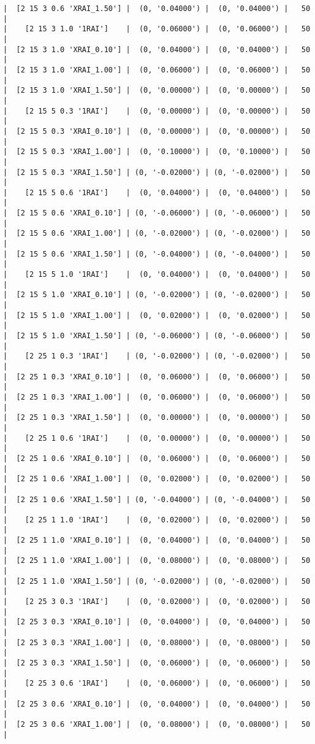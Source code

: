 \documentclass{article}
\begin{document}
\begin{verbatim}
|  [2 15 3 0.6 'XRAI_1.50'] |  (0, '0.04000') |  (0, '0.04000') |   50  |
|    [2 15 3 1.0 '1RAI']    |  (0, '0.06000') |  (0, '0.06000') |   50  |
|  [2 15 3 1.0 'XRAI_0.10'] |  (0, '0.04000') |  (0, '0.04000') |   50  |
|  [2 15 3 1.0 'XRAI_1.00'] |  (0, '0.06000') |  (0, '0.06000') |   50  |
|  [2 15 3 1.0 'XRAI_1.50'] |  (0, '0.00000') |  (0, '0.00000') |   50  |
|    [2 15 5 0.3 '1RAI']    |  (0, '0.00000') |  (0, '0.00000') |   50  |
|  [2 15 5 0.3 'XRAI_0.10'] |  (0, '0.00000') |  (0, '0.00000') |   50  |
|  [2 15 5 0.3 'XRAI_1.00'] |  (0, '0.10000') |  (0, '0.10000') |   50  |
|  [2 15 5 0.3 'XRAI_1.50'] | (0, '-0.02000') | (0, '-0.02000') |   50  |
|    [2 15 5 0.6 '1RAI']    |  (0, '0.04000') |  (0, '0.04000') |   50  |
|  [2 15 5 0.6 'XRAI_0.10'] | (0, '-0.06000') | (0, '-0.06000') |   50  |
|  [2 15 5 0.6 'XRAI_1.00'] | (0, '-0.02000') | (0, '-0.02000') |   50  |
|  [2 15 5 0.6 'XRAI_1.50'] | (0, '-0.04000') | (0, '-0.04000') |   50  |
|    [2 15 5 1.0 '1RAI']    |  (0, '0.04000') |  (0, '0.04000') |   50  |
|  [2 15 5 1.0 'XRAI_0.10'] | (0, '-0.02000') | (0, '-0.02000') |   50  |
|  [2 15 5 1.0 'XRAI_1.00'] |  (0, '0.02000') |  (0, '0.02000') |   50  |
|  [2 15 5 1.0 'XRAI_1.50'] | (0, '-0.06000') | (0, '-0.06000') |   50  |
|    [2 25 1 0.3 '1RAI']    | (0, '-0.02000') | (0, '-0.02000') |   50  |
|  [2 25 1 0.3 'XRAI_0.10'] |  (0, '0.06000') |  (0, '0.06000') |   50  |
|  [2 25 1 0.3 'XRAI_1.00'] |  (0, '0.06000') |  (0, '0.06000') |   50  |
|  [2 25 1 0.3 'XRAI_1.50'] |  (0, '0.00000') |  (0, '0.00000') |   50  |
|    [2 25 1 0.6 '1RAI']    |  (0, '0.00000') |  (0, '0.00000') |   50  |
|  [2 25 1 0.6 'XRAI_0.10'] |  (0, '0.06000') |  (0, '0.06000') |   50  |
|  [2 25 1 0.6 'XRAI_1.00'] |  (0, '0.02000') |  (0, '0.02000') |   50  |
|  [2 25 1 0.6 'XRAI_1.50'] | (0, '-0.04000') | (0, '-0.04000') |   50  |
|    [2 25 1 1.0 '1RAI']    |  (0, '0.02000') |  (0, '0.02000') |   50  |
|  [2 25 1 1.0 'XRAI_0.10'] |  (0, '0.04000') |  (0, '0.04000') |   50  |
|  [2 25 1 1.0 'XRAI_1.00'] |  (0, '0.08000') |  (0, '0.08000') |   50  |
|  [2 25 1 1.0 'XRAI_1.50'] | (0, '-0.02000') | (0, '-0.02000') |   50  |
|    [2 25 3 0.3 '1RAI']    |  (0, '0.02000') |  (0, '0.02000') |   50  |
|  [2 25 3 0.3 'XRAI_0.10'] |  (0, '0.04000') |  (0, '0.04000') |   50  |
|  [2 25 3 0.3 'XRAI_1.00'] |  (0, '0.08000') |  (0, '0.08000') |   50  |
|  [2 25 3 0.3 'XRAI_1.50'] |  (0, '0.06000') |  (0, '0.06000') |   50  |
|    [2 25 3 0.6 '1RAI']    |  (0, '0.06000') |  (0, '0.06000') |   50  |
|  [2 25 3 0.6 'XRAI_0.10'] |  (0, '0.04000') |  (0, '0.04000') |   50  |
|  [2 25 3 0.6 'XRAI_1.00'] |  (0, '0.08000') |  (0, '0.08000') |   50  |

\end{verbatim}
\end{document}
